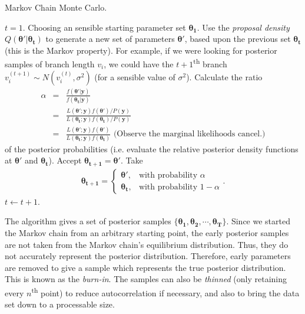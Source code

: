 \documentclass[12pt]{article}
\begin{document}
\begin{algorithm}[h!]
\caption{Markov Chain Monte Carlo.}
\label{alg:MCMC}
\begin{algorithmic}[1] %
  \STATE $t = 1$.
  \STATE Choosing an sensible starting parameter set $\bm{\theta_1}$.
  \STATE Use the \emph{proposal density} $Q(\bm{\theta'}|\bm{\theta_t})$ to generate a new set of parameters $\bm{\theta'}$, based upon the previous set $\bm{\theta_t}$ (this is the Markov property). For example, if we were looking for posterior samples of  branch length $v_i$, we could have the $t+1$\textsuperscript{th} branch $v_i^{(t+1)} \sim N(v_i^{(t)},\sigma^2)$ (for a sensible value of $\sigma^2$).
  \STATE Calculate the ratio
  \begin{eqnarray}
    \alpha &=& \frac{f(\bm{\theta'}|\bm{y})}{f(\bm{\theta_t}|\bm{y})} \\
    &=& \frac{L(\bm{\theta'};\bm{y})f(\bm{\theta'})/P(\bm{y})}{L(\bm{\theta_t};\bm{y})f(\bm{\theta_t})/P(\bm{y})} \nonumber \\
    &=& \frac{L(\bm{\theta'};\bm{y})f(\bm{\theta'})}{L(\bm{\theta_t};\bm{y})f(\bm{\theta_t})} \mbox{ (Observe the marginal likelihoods cancel.)} \nonumber
  \end{eqnarray}
  of the posterior probabilities (i.e. evaluate the relative posterior density functions at $\bm{\theta'}$ and $\bm{\theta_t}$).
        \STATE Accept $\bm{\theta_{t+1}}=\bm{\theta'}$.
        \ELSE
        \STATE Take       \begin{eqnarray*} \bm{\theta_{t+1}} =
          \begin{cases} 
            \bm{\theta'}, & \text{with probability $\alpha$} \\
            \bm{\theta_t}, & \text{with probability $1-\alpha$}
          \end{cases}.
        \end{eqnarray*}
        \ENDIF
        \STATE $t \leftarrow t + 1$.
    \ENDWHILE
\end{algorithmic}
\end{algorithm}

 The algorithm gives a set of posterior samples $\{\bm{\theta_1}, \bm{\theta_2}, \cdots, \bm{\theta_{T}}  \}$. Since we started the Markov chain from an arbitrary starting point, the early posterior samples are not taken from the Markov chain's equilibrium distribution. Thus, they do not accurately represent the posterior distribution. Therefore, early parameters are removed to give a sample which represents the true posterior distribution. This is known as the \emph{burn-in}. The samples can also be \emph{thinned} (only retaining every $n$\textsuperscript{th} point) to reduce autocorrelation if necessary, and also to bring the data set down to a processable size.
\end{document}
